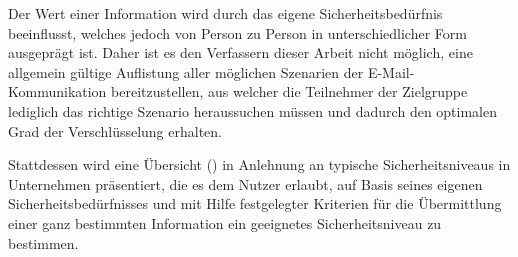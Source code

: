 \documentclass  [paper=a4,
				fontsize=12pt,
				listof=totoc,
				bibliography=totoc
				]{scrreprt}
\begin{document}
	
		Der Wert einer Information wird durch das eigene Sicherheitsbedürfnis beeinflusst, welches jedoch von Person zu Person in unterschiedlicher Form ausgeprägt ist.
		Daher ist es den Verfassern dieser Arbeit nicht möglich, eine allgemein gültige Auflistung aller möglichen Szenarien der E-Mail-Kommunikation bereitzustellen, aus welcher die Teilnehmer der Zielgruppe lediglich das richtige Szenario heraussuchen müssen und dadurch den optimalen Grad der Verschlüsselung erhalten. 
		
		Stattdessen wird eine Übersicht () in Anlehnung an typische Sicherheitsniveaus in Unternehmen präsentiert, die es dem Nutzer erlaubt, auf Basis seines eigenen Sicherheitsbedürfnisses und mit Hilfe festgelegter Kriterien für die Übermittlung einer ganz bestimmten Information ein geeignetes Sicherheitsniveau zu bestimmen. 
		\medskip
		
		
	
		
\end{document}
